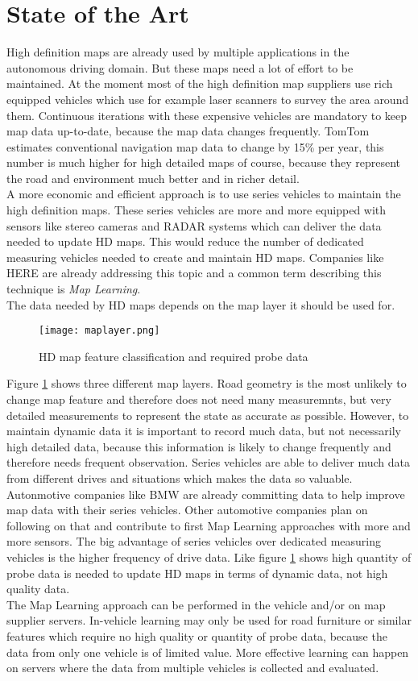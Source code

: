 \section{State of the Art}
High definition maps are already used by multiple applications in the autonomous driving domain.\cite{ieee_bertha} But these maps need a lot of effort to be maintained. At the moment most of the high definition map suppliers use rich equipped vehicles which use for example laser scanners to survey the area around them. Continuous iterations with these expensive vehicles are mandatory to keep map data up-to-date, because the map data changes frequently. TomTom estimates conventional navigation map data to change by 15\% per year\cite{tomtom}, this number is much higher for high detailed maps of course, because they represent the road and environment much better and in richer detail.\\
A more economic and efficient approach is to use series vehicles to maintain the high definition maps.\cite{ieee_maplearning} These series vehicles are more and more equipped with sensors like stereo cameras and RADAR systems which can deliver the data needed to update HD maps. This would reduce the number of dedicated measuring vehicles needed to create and maintain HD maps. Companies like HERE are already addressing this topic\cite{here_}\cite{here_2} and a common term describing this technique is \emph{Map Learning}.\\
The data needed by HD maps depends on the map layer it should be used for.
\begin{figure}[!hbt]
\texttt{[image: maplayer.png]}
\caption{HD map feature classification and required probe data\cite{ieee_maplearning}}
\label{maplayer}
\end{figure}
Figure \ref{maplayer} shows three different map layers. Road geometry is the most unlikely to change map feature and therefore does not need many measuremnts, but very detailed measurements to represent the state as accurate as possible. However, to maintain dynamic data it is important to record much data, but not necessarily high detailed data, because this information is likely to change frequently and therefore needs frequent observation. Series vehicles are able to deliver much data from different drives and situations which makes the data so valuable. Autonmotive companies like BMW are already committing data to help improve map data with their series vehicles\cite{bmw_here}. Other automotive companies plan on following on that and contribute to first Map Learning approaches with more and more sensors. The big advantage of series vehicles over dedicated measuring vehicles is the higher frequency of drive data\cite{sensorLearning}. Like figure \ref{maplayer} shows high quantity of probe data is needed to update HD maps in terms of dynamic data,   not high quality data.\\
The Map Learning approach can be performed in the vehicle and/or on map supplier servers. In-vehicle learning may only be used for road furniture or similar features which require no high quality or quantity of probe data, because the data from only one vehicle is of limited value. More effective learning can happen on servers where the data from multiple vehicles is collected and evaluated\cite{sensorLearning}.